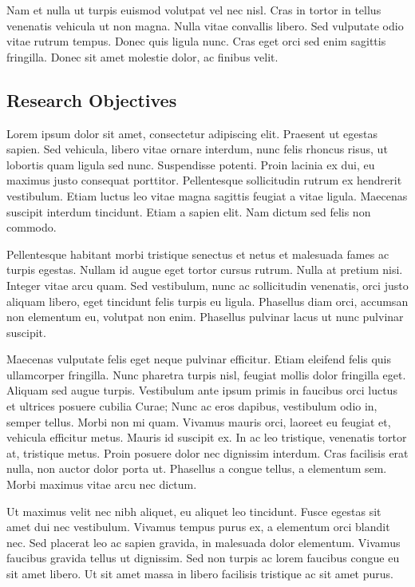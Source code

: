 \documentclass[runningheads,a4paper]{llncs}
\begin{document}
Nam et nulla ut turpis euismod volutpat vel nec nisl. Cras in tortor in tellus venenatis vehicula ut non magna. Nulla vitae convallis libero. Sed vulputate odio vitae rutrum tempus. Donec quis ligula nunc. Cras eget orci sed enim sagittis fringilla. Donec sit amet molestie dolor, ac finibus velit.
%
\newpage
%
\subsection{Research Objectives}
Lorem ipsum dolor sit amet, consectetur adipiscing elit. Praesent ut egestas sapien. Sed vehicula, libero vitae ornare interdum, nunc felis rhoncus risus, ut lobortis quam ligula sed nunc. Suspendisse potenti. Proin lacinia ex dui, eu maximus justo consequat porttitor. Pellentesque sollicitudin rutrum ex hendrerit vestibulum. Etiam luctus leo vitae magna sagittis feugiat a vitae ligula. Maecenas suscipit interdum tincidunt. Etiam a sapien elit. Nam dictum sed felis non commodo.

Pellentesque habitant morbi tristique senectus et netus et malesuada fames ac turpis egestas. Nullam id augue eget tortor cursus rutrum. Nulla at pretium nisi. Integer vitae arcu quam. Sed vestibulum, nunc ac sollicitudin venenatis, orci justo aliquam libero, eget tincidunt felis turpis eu ligula. Phasellus diam orci, accumsan non elementum eu, volutpat non enim. Phasellus pulvinar lacus ut nunc pulvinar suscipit.

Maecenas vulputate felis eget neque pulvinar efficitur. Etiam eleifend felis quis ullamcorper fringilla. Nunc pharetra turpis nisl, feugiat mollis dolor fringilla eget. Aliquam sed augue turpis. Vestibulum ante ipsum primis in faucibus orci luctus et ultrices posuere cubilia Curae; Nunc ac eros dapibus, vestibulum odio in, semper tellus. Morbi non mi quam. Vivamus mauris orci, laoreet eu feugiat et, vehicula efficitur metus. Mauris id suscipit ex. In ac leo tristique, venenatis tortor at, tristique metus. Proin posuere dolor nec dignissim interdum. Cras facilisis erat nulla, non auctor dolor porta ut. Phasellus a congue tellus, a elementum sem. Morbi maximus vitae arcu nec dictum.

Ut maximus velit nec nibh aliquet, eu aliquet leo tincidunt. Fusce egestas sit amet dui nec vestibulum. Vivamus tempus purus ex, a elementum orci blandit nec. Sed placerat leo ac sapien gravida, in malesuada dolor elementum. Vivamus faucibus gravida tellus ut dignissim. Sed non turpis ac lorem faucibus congue eu sit amet libero. Ut sit amet massa in libero facilisis tristique ac sit amet purus.
\end{document}
